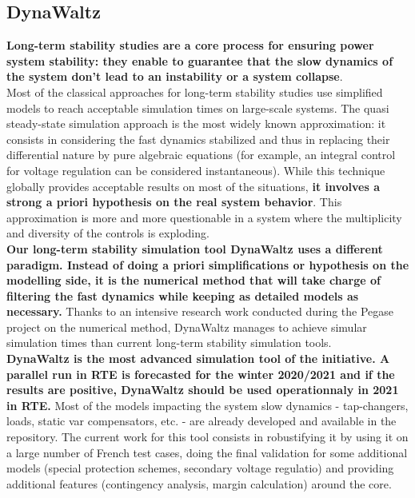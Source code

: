 \documentclass[a4paper, 12pt]{report}
\begin{document}
\newpage
\subsection{DynaWaltz}

\textbf{Long-term stability studies are a core process for ensuring power system stability: they enable to guarantee that the slow dynamics of the system don't lead to an instability or a system collapse}.\\

Most of the classical approaches for long-term stability studies use simplified models to reach acceptable simulation times on large-scale systems. The quasi steady-state simulation approach is the most widely known approximation: it consists in considering the fast dynamics stabilized and thus in replacing their differential nature by pure algebraic equations (for example, an integral control for voltage regulation can be considered instantaneous). While this technique globally provides acceptable results on most of the situations, \textbf{it involves a strong a priori hypothesis on the real system behavior}. This approximation is more and more questionable in a system where the multiplicity and diversity of the controls is exploding. \\

\textbf{Our long-term stability simulation tool DynaWaltz uses a different paradigm. Instead of doing a priori simplifications or hypothesis on the modelling side, it is the numerical method that will take charge of filtering the fast dynamics while keeping as detailed models as necessary.} Thanks to an intensive research work conducted during the Pegase project on the numerical method, DynaWaltz manages to achieve simular simulation times than current long-term stability simulation tools.\\

\textbf{DynaWaltz is the most advanced simulation tool of the \Dynawo initiative. A parallel run in RTE is forecasted for the winter 2020/2021 and if the results are positive, DynaWaltz should be used operationnaly in 2021 in RTE.} Most of the models impacting the system slow dynamics - tap-changers, loads, static var compensators, etc. - are already developed and available in the repository. The current work for this tool consists in robustifying it by using it on a large number of French test cases, doing the final validation for some additional models (special protection schemes, secondary voltage regulatio) and providing additional features (contingency analysis, margin calculation) around the core.
\end{document}
